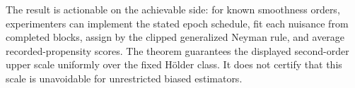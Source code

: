 The result is actionable on the achievable side: for known smoothness orders, experimenters can implement the stated epoch schedule, fit each nuisance from completed blocks, assign by the clipped generalized Neyman rule, and average recorded-propensity scores.  The theorem guarantees the displayed second-order upper scale uniformly over the fixed Hölder class.  It does not certify that this scale is unavoidable for unrestricted biased estimators.